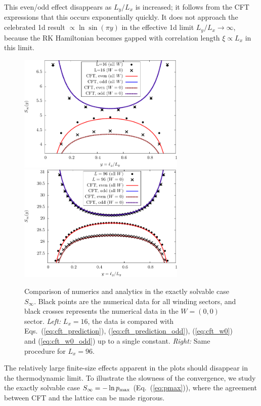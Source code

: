 \documentclass[11pt]{iopart}
\begin{document}
This even/odd effect disappears as $L_y/L_x$ is increased; it follows from the CFT expressions that this occurs exponentially quickly.  It does not approach the celebrated 1d result\cite{Cardy} $\propto \ln\sin (\pi y)$ in the effective 1d limit $L_y/L_x\to\infty$, because the RK Hamiltonian becomes gapped with correlation length $\xi\propto L_x$ in this limit. 



\begin{figure}[ht]
 \begin{center}
  \includegraphics[width=8cm]{./figures/sinfty_16.pdf}
  \includegraphics[width=8cm]{./figures/sinfty_96.pdf}
 \end{center}
\caption{Comparison of numerics and analytics in the exactly solvable case $S_\infty$. Black points are the numerical data for all winding sectors, and black crosses represents the numerical data in the $W=(0,0)$ sector. \emph{Left:} $L_x=16$, the data is compared with Eqs.~(\ref{eq:cft_prediction}), (\ref{eq:cft_prediction_odd}),  (\ref{eq:cft_w0}) and (\ref{eq:cft_w0_odd}) up to a single constant. \emph{Right:} Same procedure for $L_x=96$. }
\label{fig:Sinfty}
\end{figure}
The relatively large finite-size effects apparent in the plots should disappear in the thermodynamic limit.  To illustrate the slowness of the convergence, we study the exactly solvable case $S_\infty=-\ln p_{\rm max}$ (Eq.~(\ref{eq:pmax})), where the agreement between CFT and the lattice can be made rigorous. 
\end{document}
